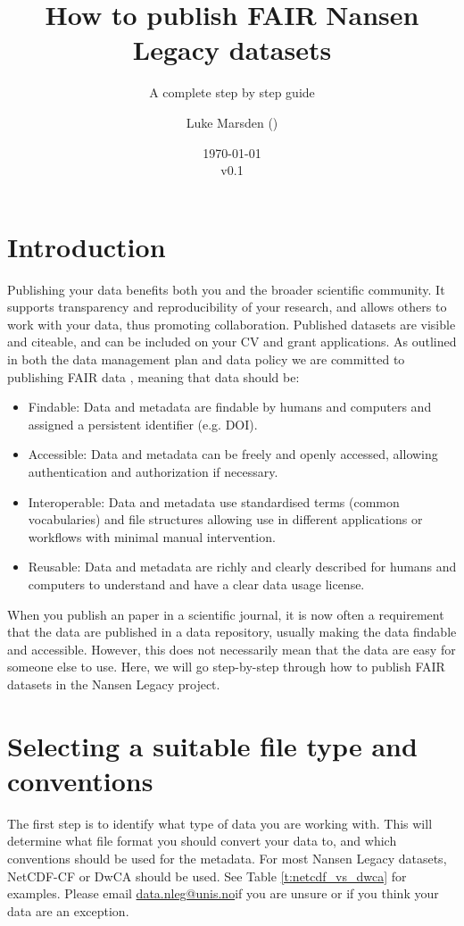 \documentclass[a4paper,english, 11pt]{article}
\title{How to publish FAIR Nansen Legacy datasets}
\subtitle{A complete step by step guide}
\date{\today\\v0.1}
\author{Luke Marsden (\emailme)}
\makeatletter
\newcommand{\emailme}{\href{mailto:data.nleg@unis.no}{data.nleg@unis.no}}
\makeatother
\begin{document}
\maketitle
\tableofcontents
\pagestyle{fancy}
\newpage
\section{Introduction}
\label{s:Introduction}

Publishing your data benefits both you and the broader scientific community. It supports transparency and reproducibility of your research, and allows others to work with your data, thus promoting collaboration. Published datasets are visible and citeable, and can be included on your CV and grant applications. As outlined in both the data management plan \citep{aendmp2021} and data policy \citep{aendatapolicy2021} we are committed to publishing FAIR data \citep{wilkinson2016fair}, meaning that data should be:

\begin{itemize}
\item Findable: Data and metadata are findable by humans and computers and assigned a persistent identifier (e.g. DOI).
\item Accessible: Data and metadata can be freely and openly accessed, allowing authentication and authorization if necessary.
\item Interoperable: Data and metadata use standardised terms (common vocabularies) and file structures allowing use in different applications or workflows with minimal manual intervention. 
\item Reusable: Data and metadata are richly and clearly described for humans and computers to understand and have a clear data usage license. 
\end{itemize}

When you publish an paper in a scientific journal, it is now often a requirement that the data are published in a data repository, usually making the data findable and accessible. However, this does not necessarily mean that the data are easy for someone else to use. Here, we will go step-by-step through how to publish FAIR datasets in the Nansen Legacy project.

\section{Selecting a suitable file type and conventions}
\label{s:FileType}

The first step is to identify what type of data you are working with. This will determine what file format you should convert your data to, and which conventions should be used for the metadata. For most Nansen Legacy datasets, NetCDF-CF or DwCA should be used. See Table \ref{t:netcdf_vs_dwca} for examples. Please email \emailme if you are unsure or if you think your data are an exception.
\end{document}
